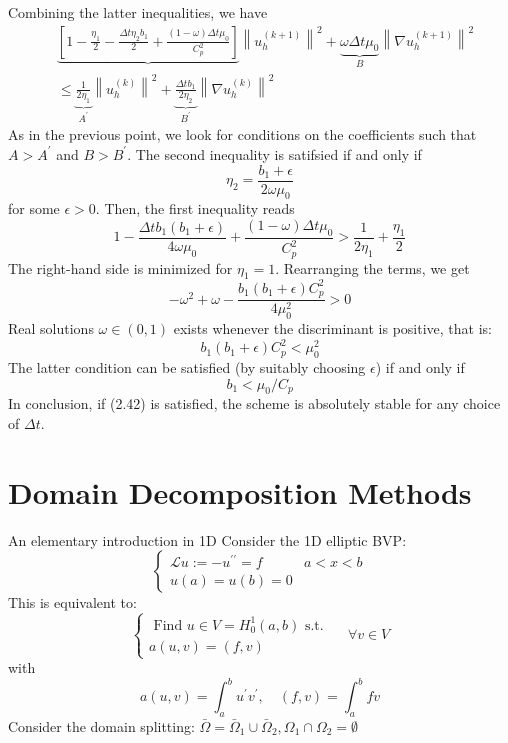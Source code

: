\documentclass[11pt]{book}
\begin{document}
Combining the latter inequalities, we have
$$
\begin{aligned}
& \underbrace{\left[1-\frac{\eta_{1}}{2}-\frac{\Delta t \eta_{2} b_{1}}{2}+\frac{(1-\omega) \Delta t \mu_{0}}{C_{p}^{2}}\right]}\left\|u_{h}^{(k+1)}\right\|^{2}+\underbrace{\omega \Delta t \mu_{0}}_{B}\left\|\nabla u_{h}^{(k+1)}\right\|^{2} \\
& \leq \underbrace{\frac{1}{2 \eta_{1}}}_{A^{\prime}}\left\|u_{h}^{(k)}\right\|^{2}+\underbrace{\frac{\Delta t b_{1}}{2 \eta_{2}}}_{B^{\prime}}\left\|\nabla u_{h}^{(k)}\right\|^{2}
\end{aligned}
$$
As in the previous point, we look for conditions on the coefficients such that $A>A^{\prime}$ and $B>B^{\prime}$. The second inequality is satifsied if and only if
$$
\eta_{2}=\frac{b_{1}+\epsilon}{2 \omega \mu_{0}}
$$
for some $\epsilon>0$.
Then, the first inequality reads
$$
1-\frac{\Delta t b_{1}\left(b_{1}+\epsilon\right)}{4 \omega \mu_{0}}+\frac{(1-\omega) \Delta t \mu_{0}}{C_{p}^{2}}>\frac{1}{2 \eta_{1}}+\frac{\eta_{1}}{2}
$$
The right-hand side is minimized for $\eta_{1}=1$. Rearranging the terms, we get
$$
-\omega^{2}+\omega-\frac{b_{1}\left(b_{1}+\epsilon\right) C_{p}^{2}}{4 \mu_{0}^{2}}>0
$$
Real solutions $\omega \in(0,1)$ exists whenever the discriminant is positive, that is:
$$
b_{1}\left(b_{1}+\epsilon\right) C_{p}^{2}<\mu_{0}^{2}
$$
The latter condition can be satisfied (by suitably choosing $\epsilon$) if and only if
\begin{equation}
b_{1}<\mu_{0} / C_{p}
\end{equation}
In conclusion, if (2.42) is satisfied, the scheme is absolutely stable for any choice of $\Delta t$.

\chapter{Domain Decomposition Methods}
An elementary introduction in 1D
Consider the 1D elliptic BVP:
$$
\begin{cases}\mathcal{L} u:=-u^{\prime \prime}=f & a<x<b \\ u(a)=u(b)=0 & \end{cases}
$$
This is equivalent to:
$$
\left\{\begin{array}{l}
\text { Find } u \in V=H_{0}^{1}(a, b) \text { s.t. } \\
a(u, v)=(f, v)
\end{array} \quad \forall v \in V\right.
$$
with
$$
a(u, v)=\int_{a}^{b} u^{\prime} v^{\prime}, \quad(f, v)=\int_{a}^{b} f v
$$
Consider the domain splitting: $\bar{\Omega}=\bar{\Omega}_{1} \cup \bar{\Omega}_{2}, \Omega_{1} \cap \Omega_{2}=\emptyset$
\end{document}

